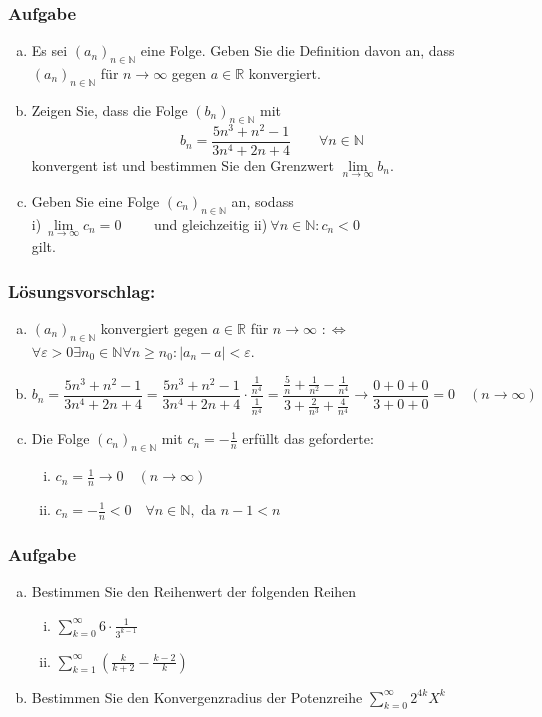 \documentclass[a4paper,11pt]{scrartcl}
\newcounter{auf}
\newcommand{\Aufgabe}%
        {\addtocounter{auf}{1} \subsubsection*{\rmfamily  Aufgabe \theauf \hspace{1em}} }
\newcommand{\N}{\mathbb{N}}
\newcommand{\RR}{\mathbb{R}}
\begin{document}
\Aufgabe

\begin{enumerate}[a)]

\item Es sei $(a_n)_{n \in \N}$ eine Folge. Geben Sie die Definition davon an, dass $(a_n)_{n \in \N}$ für $n \to \infty$ gegen $a \in \RR$ konvergiert.
\item Zeigen Sie, dass die Folge $(b_n)_{n \in \N}$ mit 
$$
b_n=\frac{5n^3+n^2-1}{3n^4+2n+4} \qquad \forall n \in \N
$$
konvergent ist und bestimmen Sie den Grenzwert $\lim \limits_{n\to \infty} b_n$.
\item Geben Sie eine Folge $(c_n)_{n \in \N}$ an, sodass \vspace{3mm}\\
\hspace*{5mm} i)$\ \lim \limits_{n \to \infty}c_n=0 \qquad$ und gleichzeitig \qquad ii)$\ \forall n \in \N: c_n < 0$ \vspace{3mm}\\
gilt.
\end{enumerate}
%
%
\subsubsection*{Lösungsvorschlag:}
	\begin{enumerate}[a)]
	\item $(a_n)_{n \in \N}$ konvergiert gegen $a \in \RR$ für $n \to \infty$ $:\Leftrightarrow$ $\forall \varepsilon >0 \exists n_0 \in \N \forall n \ge n_0: |a_n-a|<\varepsilon$.
	\item 
	$$
	b_n=\frac{5n^3+n^2-1}{3n^4+2n+4}=\frac{5n^3+n^2-1}{3n^4+2n+4}\cdot \frac{\frac{1}{n^4}}{\frac{1}{n^4}}=\frac{\frac{5}{n}+\frac{1}{n^2}-\frac{1}{n^4}}{3+\frac{2}{n^3}+\frac{4}{n^4}} \to \frac{0+0+0}{3+0+0}=0 \quad (n \to \infty)
	$$
	\item Die Folge $(c_n)_{n \in \N}$ mit $c_n=-\frac{1}{n}$ erfüllt das geforderte:
		\begin{enumerate}[i)]
		\item $c_n=\frac{1}{n} \to 0 \quad (n \to \infty)$
		\item $c_n=-\frac{1}{n} < 0 \quad \forall n \in \N, \text{ da } n-1 < n$
		\end{enumerate}
	\end{enumerate}


\newpage
\Aufgabe
\begin{enumerate}[a)]
\item Bestimmen Sie den Reihenwert der folgenden Reihen
	\begin{enumerate}[i)]
	\item $\sum \limits_{k=0}^\infty 6\cdot \frac{1}{3^{k-1}}$
	\item $\sum \limits_{k=1}^\infty\left( \frac{k}{k+2}-\frac{k-2}{k}\right)$
	\end{enumerate}
\item Bestimmen Sie den Konvergenzradius der Potenzreihe $\sum \limits_{k=0}^\infty 2^{4k} X^k$
\end{enumerate}
%
%
\end{document}

